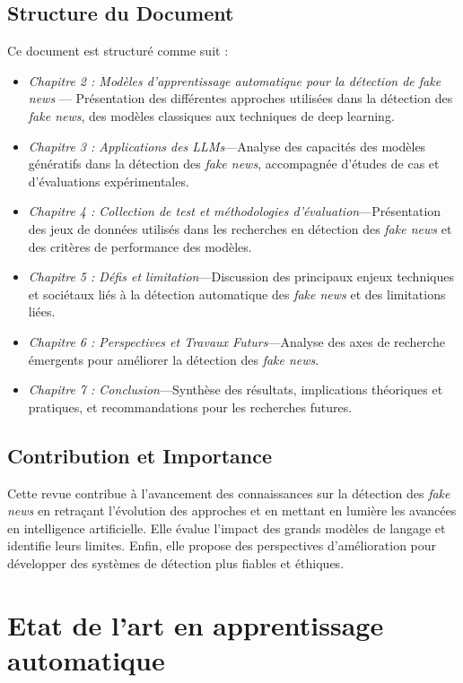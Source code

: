 \documentclass[a4paper,12pt, twocolumn]{article}
\begin{document}
\begin{twocolumn}
\subsection{Structure du Document}
Ce document est structuré comme suit :
\begin{itemize}
\item \textit{Chapitre 2 : Modèles d'apprentissage automatique pour la détection de \textit{fake news}} — Présentation des différentes approches utilisées dans la détection des \textit{fake news}, des modèles classiques aux techniques de deep learning.
\item \textit{Chapitre 3 : Applications des LLMs}—Analyse des capacités des modèles génératifs dans la détection des \textit{fake news}, accompagnée d’études de cas et d’évaluations expérimentales.
\item \textit{Chapitre 4 : Collection de test et méthodologies d’évaluation}—Présentation des jeux de données utilisés dans les recherches en détection des \textit{fake news} et des critères de performance des modèles.
\item \textit{Chapitre 5 : Défis et limitation}—Discussion des principaux enjeux techniques et sociétaux liés à la détection automatique des \textit{fake news} et des limitations liées.
\item \textit{Chapitre 6 : Perspectives et Travaux Futurs}—Analyse des axes de recherche émergents pour améliorer la détection des \textit{fake news}.
\item \textit{Chapitre 7 : Conclusion}—Synthèse des résultats, implications théoriques et pratiques, et recommandations pour les recherches futures.
\end{itemize}

\subsection{Contribution et Importance}
Cette revue contribue à l’avancement des connaissances sur la détection des \textit{fake news} en retraçant l’évolution des approches et en mettant en lumière les avancées en intelligence artificielle. Elle évalue l’impact des grands modèles de langage et identifie leurs limites. Enfin, elle propose des perspectives d’amélioration pour développer des systèmes de détection plus fiables et éthiques.

\section{Etat de l’art en apprentissage automatique}
\label{chap:etat_art_ml}


\end{twocolumn}
\end{document}
